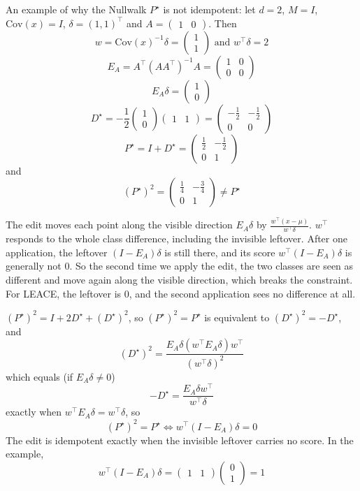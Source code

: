 \documentclass[10pt,a4paper,twocolumn]{article}
\begin{document}
	An example of why the Nullwalk $P^\star$ is not idempotent: let $d = 2$, $M = I$, $\mathrm{Cov}(x) = I$, $\delta = (1, 1)^\top$ and $A = \begin{pmatrix} 1 & 0 \end{pmatrix}$. Then
	$$w = \mathrm{Cov}(x)^{-1} \delta = \begin{pmatrix} 1 \\ 1 \end{pmatrix} \text{ and } w^\top \delta = 2$$
	$$E_A = A^\top (A A^\top)^{-1} A = \begin{pmatrix} 1 & 0 \\ 0 & 0 \end{pmatrix}$$
	$$E_A \delta = \begin{pmatrix} 1 \\ 0 \end{pmatrix}$$
	$$D^\star = - \frac{1}{2} \begin{pmatrix} 1 \\ 0 \end{pmatrix} \begin{pmatrix} 1 & 1 \end{pmatrix} = \begin{pmatrix} - \frac{1}{2} & - \frac{1}{2} \\ 0 & 0 \end{pmatrix}$$
	$$P^\star = I + D^\star = \begin{pmatrix} \frac{1}{2} & - \frac{1}{2} \\ 0 & 1 \end{pmatrix}$$
	and
	$$(P^\star)^2 = \begin{pmatrix} \frac{1}{4} & - \frac{3}{4} \\ 0 & 1 \end{pmatrix} \ne P^\star$$

	The edit moves each point along the visible direction $E_A \delta$ by $\frac{w^\top (x - \mu)}{w^\top \delta}$. $w^\top$ responds to the whole class difference, including the invisible leftover. After one application, the leftover $(I - E_A) \delta$ is still there, and its score $w^\top (I - E_A) \delta$ is generally not $0$. So the second time we apply the edit, the two classes are seen as different and move again along the visible direction, which breaks the constraint. For LEACE, the leftover is $0$, and the second application sees no difference at all.

	$(P^\star)^2 = I + 2 D^\star + (D^\star)^2$, so $(P^\star)^2 = P^\star$ is equivalent to $(D^\star)^2 = - D^\star$, and
	$$(D^\star)^2 = \frac{E_A \delta (w^\top E_A \delta) w^\top}{(w^\top \delta)^2}$$
	which equals (if $E_A \delta \ne 0$)
	$$- D^\star = \frac{E_A \delta w^\top}{w^\top \delta}$$
	exactly when $w^\top E_A \delta = w^\top \delta$, so
	$$(P^\star)^2 = P^\star \iff w^\top (I - E_A) \delta = 0$$
	The edit is idempotent exactly when the invisible leftover carries no score. In the example,
	$$w^\top (I - E_A) \delta = \begin{pmatrix} 1 & 1 \end{pmatrix} \begin{pmatrix} 0 \\ 1 \end{pmatrix} = 1$$
\end{document}
